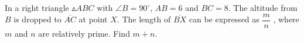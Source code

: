 In a right triangle $\vartriangle ABC$ with $\angle B = 90^{\circ}$, $AB = 6$ and $BC = 8$. The altitude from $B$ is dropped to $\overline{AC}$ at point $X$. The length of $\overline{BX}$ can be expressed as $\dfrac{m}{n}$ , where $m$ and $n$ are relatively prime. Find $m + n$.
